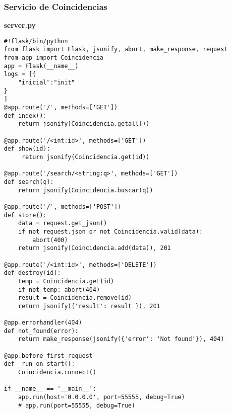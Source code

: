 \subsubsection{Servicio de Coincidencias}
{\sffamily \textbf{server.py}}
\begin{mdframed}[linecolor=black, topline=true, bottomline=true,
  leftline=false, rightline=false, backgroundcolor=LightGray,userdefinedwidth=\textwidth]
\begin{verbatim}
#!flask/bin/python
from flask import Flask, jsonify, abort, make_response, request
from app import Coincidencia
app = Flask(__name__)
logs = [{
    "inicial":"init"
}
]
@app.route('/', methods=['GET'])
def index():
    return jsonify(Coincidencia.getall())

@app.route('/<int:id>', methods=['GET'])
def show(id):
     return jsonify(Coincidencia.get(id))

@app.route('/search/<string:q>', methods=['GET'])
def search(q):
    return jsonify(Coincidencia.buscar(q))

@app.route('/', methods=['POST'])
def store():
    data = request.get_json()
    if not request.json or not Coincidencia.valid(data):
        abort(400)
    return jsonify(Coincidencia.add(data)), 201

@app.route('/<int:id>', methods=['DELETE'])
def destroy(id):
    temp = Coincidencia.get(id)
    if not temp: abort(404)
    result = Coincidencia.remove(id)
    return jsonify({'result': result }), 201

@app.errorhandler(404)
def not_found(error):
    return make_response(jsonify({'error': 'Not found'}), 404)

@app.before_first_request
def _run_on_start():
    Coincidencia.connect()

if __name__ == '__main__':
    app.run(host='0.0.0.0', port=55555, debug=True)
    # app.run(port=55555, debug=True)

\end{verbatim}
\end{mdframed}

